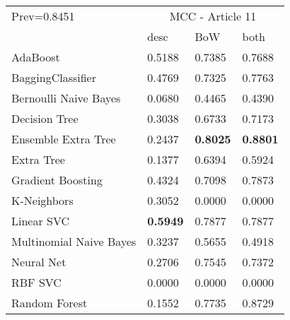 \begin{tabular}{|l|l|l|l| }
\hline
Prev=0.8451 &  \multicolumn{3}{c|}{MCC - Article 11} \\
\cline{2-4} & desc & BoW & both \\ \hline
AdaBoost                & 0.5188 & 0.7385 & 0.7688\\
BaggingClassifier       & 0.4769 & 0.7325 & 0.7763\\
Bernoulli Naive Bayes   & 0.0680 & 0.4465 & 0.4390\\
Decision Tree           & 0.3038 & 0.6733 & 0.7173\\
Ensemble Extra Tree     & 0.2437 & {\bf 0.8025} & {\bf 0.8801}\\
Extra Tree              & 0.1377 & 0.6394 & 0.5924\\
Gradient Boosting       & 0.4324 & 0.7098 & 0.7873\\
K-Neighbors             & 0.3052 & 0.0000 & 0.0000\\
Linear SVC              & {\bf 0.5949} & 0.7877 & 0.7877\\
Multinomial Naive Bayes & 0.3237 & 0.5655 & 0.4918\\
Neural Net              & 0.2706 & 0.7545 & 0.7372\\
RBF SVC                 & 0.0000 & 0.0000 & 0.0000\\
Random Forest           & 0.1552 & 0.7735 & 0.8729\\
\hline
\end{tabular}